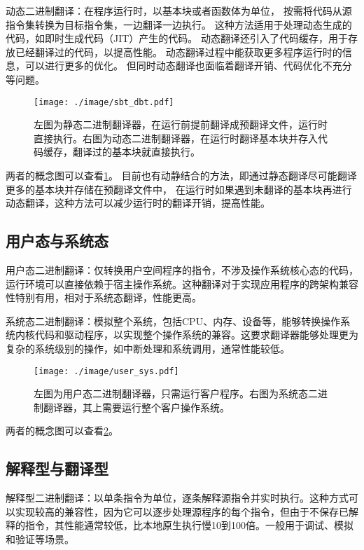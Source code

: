 动态二进制翻译：在程序运行时，以基本块或者函数体为单位，
按需将代码从源指令集转换为目标指令集，一边翻译一边执行。
这种方法适用于处理动态生成的代码，如即时生成代码（JIT）产生的代码。
动态翻译还引入了代码缓存，用于存放已经翻译过的代码，以提高性能。
动态翻译过程中能获取更多程序运行时的信息，可以进行更多的优化。
但同时动态翻译也面临着翻译开销、代码优化不充分等问题。

\begin{figure}[!htbp]
  \centering
  \texttt{[image: ./image/sbt\_dbt.pdf]}
  \caption{左图为静态二进制翻译器，在运行前提前翻译成预翻译文件，运行时直接执行。右图为动态二进制翻译器，在运行时翻译基本块并存入代码缓存，翻译过的基本块就直接执行。}
  \label{img:sbt_dbt}
\end{figure}

两者的概念图可以查看\ref{img:sbt_dbt}。
目前也有动静结合的方法，即通过静态翻译尽可能翻译更多的基本块并存储在预翻译文件中，
在运行时如果遇到未翻译的基本块再进行动态翻译，这种方法可以减少运行时的翻译开销，提高性能。

\subsection{用户态与系统态}
用户态二进制翻译：仅转换用户空间程序的指令，不涉及操作系统核心态的代码，运行环境可以直接依赖于宿主操作系统。这种翻译对于实现应用程序的跨架构兼容性特别有用，相对于系统态翻译，性能更高。

系统态二进制翻译：模拟整个系统，包括CPU、内存、设备等，能够转换操作系统内核代码和驱动程序，以实现整个操作系统的兼容。这要求翻译器能够处理更为复杂的系统级别的操作，如中断处理和系统调用，通常性能较低。

\begin{figure}[!htbp]
  \centering
  \texttt{[image: ./image/user\_sys.pdf]}
  \caption{左图为用户态二进制翻译器，只需运行客户程序。右图为系统态二进制翻译器，其上需要运行整个客户操作系统。}
  \label{img:user_sys}
\end{figure}

两者的概念图可以查看\ref{img:user_sys}。

\subsection{解释型与翻译型}
解释型二进制翻译：以单条指令为单位，逐条解释源指令并实时执行。这种方式可以实现较高的兼容性，因为它可以逐步处理源程序的每个指令，但由于不保存已解释的指令，其性能通常较低，比本地原生执行慢10到100倍。一般用于调试、模拟和验证等场景。

